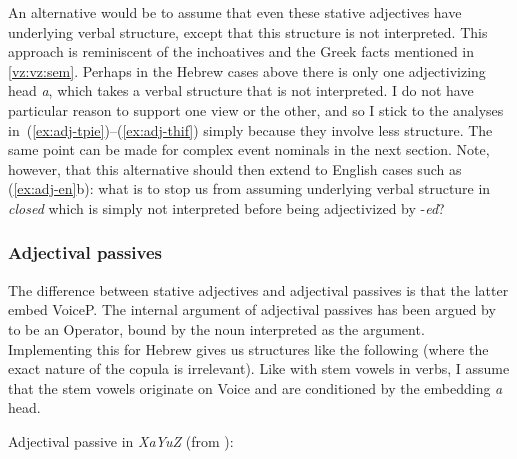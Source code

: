 \begin{exe}
\begin{xlist}
\begin{exe}
\begin{xlist}
\begin{exe}
\begin{exe}
\begin{xlist}
\begin{exe}
\begin{exe}
\begin{xlist}
\begin{exe}
\begin{xlist}
\begin{exe}
\begin{xlist}
\begin{exe}
\begin{xlist}
\begin{xlist}
\begin{exe}
\begin{xlist}
\begin{exe}
\begin{xlist}
\begin{exe}
\begin{exe}
\begin{exe}
\begin{xlist}
\begin{exe}
\begin{exe}
\begin{xlist}
\begin{exe}
\begin{xlist}
\begin{exe}
\begin{xlist}
\begin{exe}
\begin{xlist}
\begin{xlist}
\begin{exe}
\begin{xlist}
\begin{exe}
\begin{xlist}
\begin{exe}
\begin{xlist}
\begin{exe}
\begin{xlist}
\begin{exe}
\begin{exe}
\begin{exe}
\begin{exe}
An alternative would be to assume that even these stative adjectives have underlying verbal structure, except that this structure is not interpreted. This approach is reminiscent of the inchoatives and the Greek facts mentioned in \ref{vz:vz:sem}. Perhaps in the Hebrew cases above there is only one adjectivizing head \emph{a}, which takes a verbal structure that is not interpreted. I do not have particular reason to support one view or the other, and so I stick to the analyses in~(\ref{ex:adj-tpie})--(\ref{ex:adj-thif}) simply because they involve less structure. The same point can be made for complex event nominals in the next section. Note, however, that this alternative should then extend to English cases such as (\ref{ex:adj-en}b): what is to stop us from assuming underlying verbal structure in \emph{closed} which is simply not interpreted before being adjectivized by -\emph{ed}?

		\subsubsection{Adjectival passives}
The difference between stative adjectives and adjectival passives is that the latter embed VoiceP. The internal argument of adjectival passives has been argued by \citet[386]{bruening14nllt} to be an Operator, bound by the noun interpreted as the argument. Implementing this for Hebrew gives us structures like the following (where the exact nature of the copula is irrelevant). Like with stem vowels in verbs, I assume that the stem vowels originate on Voice and are conditioned by the embedding \emph{a} head.
 \begin{exe}
 \ex \label{ex:adjpass-heb1-tree} Adjectival passive in \emph{XaYuZ} (from {\tkal}): 
 \begin{xlist} 
    

\end{xlist}
\end{exe}
\end{exe}
\end{exe}
\end{exe}
\end{exe}
\end{xlist}
\end{exe}
\end{xlist}
\end{exe}
\end{xlist}
\end{exe}
\end{xlist}
\end{exe}
\end{xlist}
\end{xlist}
\end{exe}
\end{xlist}
\end{exe}
\end{xlist}
\end{exe}
\end{xlist}
\end{exe}
\end{exe}
\end{xlist}
\end{exe}
\end{exe}
\end{exe}
\end{xlist}
\end{exe}
\end{xlist}
\end{exe}
\end{xlist}
\end{xlist}
\end{exe}
\end{xlist}
\end{exe}
\end{xlist}
\end{exe}
\end{xlist}
\end{exe}
\end{exe}
\end{xlist}
\end{exe}
\end{exe}
\end{xlist}
\end{exe}
\end{xlist}
\end{exe}
